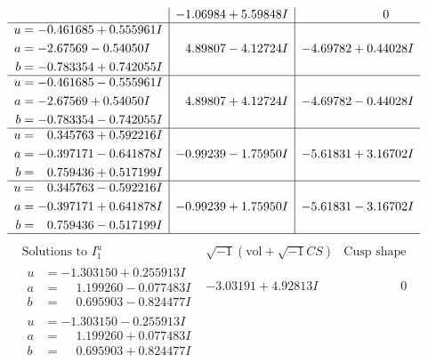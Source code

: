 \documentclass[1p]{elsarticle_modified}
\theoremstyle{definition}
\newcommand{\I}{\sqrt{-1}}
\begin{document}
$$\begin{array}{c|c|c}
 & -1.06984 + 5.59848 I & \phantom{-0.000000 } 0 \\ \hline\begin{aligned}
u &= -0.461685 + 0.555961 I \\
a &= -2.67569 - 0.54050 I \\
b &= -0.783354 + 0.742055 I\end{aligned}
 & \phantom{-}4.89807 - 4.12724 I & -4.69782 + 0.44028 I \\ \hline\begin{aligned}
u &= -0.461685 - 0.555961 I \\
a &= -2.67569 + 0.54050 I \\
b &= -0.783354 - 0.742055 I\end{aligned}
 & \phantom{-}4.89807 + 4.12724 I & -4.69782 - 0.44028 I \\ \hline\begin{aligned}
u &= \phantom{-}0.345763 + 0.592216 I \\
a &= -0.397171 - 0.641878 I \\
b &= \phantom{-}0.759436 + 0.517199 I\end{aligned}
 & -0.99239 - 1.75950 I & -5.61831 + 3.16702 I \\ \hline\begin{aligned}
u &= \phantom{-}0.345763 - 0.592216 I \\
a &= -0.397171 + 0.641878 I \\
b &= \phantom{-}0.759436 - 0.517199 I\end{aligned}
 & -0.99239 + 1.75950 I & -5.61831 - 3.16702 I\\
 \hline 
 \end{array}$$\newpage$$\begin{array}{c|c|c}  
\text{Solutions to }I^u_{1}& \I (\text{vol} + \sqrt{-1}CS) & \text{Cusp shape}\\
 \hline 
\begin{aligned}
u &= -1.303150 + 0.255913 I \\
a &= \phantom{-}1.199260 - 0.077483 I \\
b &= \phantom{-}0.695903 - 0.824477 I\end{aligned}
 & -3.03191 + 4.92813 I & \phantom{-0.000000 } 0 \\ \hline\begin{aligned}
u &= -1.303150 - 0.255913 I \\
a &= \phantom{-}1.199260 + 0.077483 I \\
b &= \phantom{-}0.695903 + 0.824477 I\end{aligned}

\end{array}$$
\end{document}
